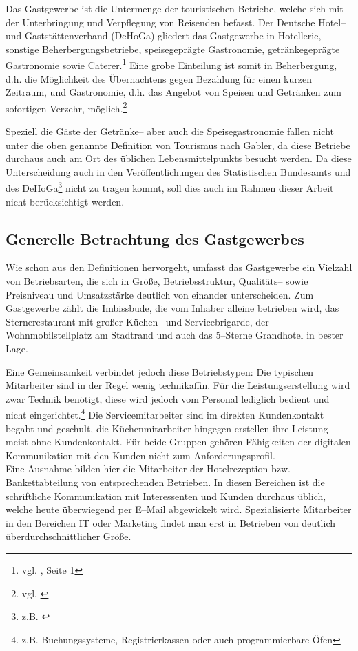 Das Gastgewerbe ist die Untermenge der touristischen Betriebe, welche sich mit der Unterbringung und Verpflegung von Reisenden befasst. Der Deutsche Hotel– und Gaststättenverband (\ac{DeHoGa}) gliedert das Gastgewerbe in Hotellerie, sonstige Beherbergungsbetriebe, speisegeprägte Gastronomie, getränkegeprägte Gastronomie sowie Caterer.\footnote{vgl. \cite{dehoga:zahlenspiegel}, Seite 1} Eine grobe Einteilung ist somit in Beherbergung, d.h. die Möglichkeit des Übernachtens gegen Bezahlung für einen kurzen Zeitraum, und Gastronomie, d.h. das Angebot von Speisen und Getränken zum sofortigen Verzehr, möglich.\footnote{vgl. \cite{destatis:gastgewerbe}}

Speziell die Gäste der Getränke-- aber auch die Speisegastronomie fallen nicht unter die oben genannte Definition von Tourismus nach Gabler, da diese Betriebe durchaus auch am Ort des üblichen Lebensmittelpunkts besucht werden. Da diese Unterscheidung auch in den Veröffentlichungen des Statistischen Bundesamts und des \ac{DeHoGa}\footnote{z.B. \cite{dehoga:zahlenspiegel}} nicht zu tragen kommt, soll dies auch im Rahmen dieser Arbeit nicht berücksichtigt werden.

\subsection{Generelle Betrachtung des Gastgewerbes} %
\label{sec:generelltouri}
Wie schon aus den Definitionen hervorgeht, umfasst das Gastgewerbe ein Vielzahl von Betriebsarten, die sich in Größe, Betriebsstruktur, Qualitäts– sowie Preisniveau und Umsatzstärke deutlich von einander unterscheiden. Zum Gastgewerbe zählt die Imbissbude, die vom Inhaber alleine betrieben wird, das Sternerestaurant mit großer Küchen– und Servicebrigarde, der Wohnmobilstellplatz am Stadtrand und auch das 5–Sterne Grandhotel in bester Lage.

Eine Gemeinsamkeit verbindet jedoch diese Betriebstypen: Die typischen Mitarbeiter sind in der Regel wenig technikaffin. Für die Leistungserstellung wird zwar Technik benötigt, diese wird jedoch vom Personal lediglich bedient und nicht eingerichtet.\footnote{z.B. Buchungssysteme, Registrierkassen oder auch programmierbare Öfen} Die Servicemitarbeiter sind im direkten Kundenkontakt begabt und geschult, die Küchenmitarbeiter hingegen erstellen ihre Leistung meist ohne Kundenkontakt. Für beide Gruppen gehören Fähigkeiten der digitalen Kommunikation mit den Kunden nicht zum Anforderungsprofil.\\
Eine Ausnahme bilden hier die Mitarbeiter der Hotelrezeption bzw. Bankettabteilung von entsprechenden Betrieben. In diesen Bereichen ist die schriftliche Kommunikation mit Interessenten und Kunden durchaus üblich, welche heute überwiegend per E–Mail abgewickelt wird. 
Spezialisierte Mitarbeiter in den Bereichen IT oder Marketing findet man erst in Betrieben von deutlich überdurchschnittlicher Größe. 

